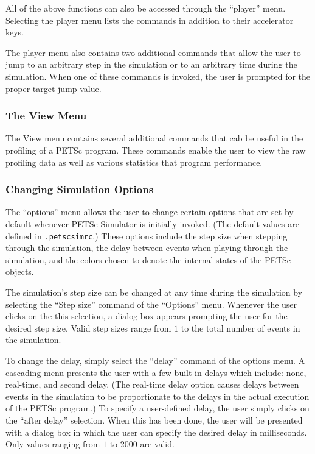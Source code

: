 All of the above functions can also be accessed through the ``player''
menu.  Selecting the player menu lists the commands in addition to
their accelerator keys.

The player menu also contains two additional commands that allow the
user to jump to an arbitrary step in the simulation or to an arbitrary
time during the simulation.  When one of these commands is invoked,
the user is prompted for the proper target jump value.

\subsubsection{The View Menu}

The View menu contains several additional commands that cab be useful
in the profiling of a PETSc program.  These commands enable the user
to view the raw profiling data as well as various statistics that
program performance.

\subsubsection{Changing Simulation Options}

The ``options'' menu allows the user to change certain options that
are set by default whenever PETSc Simulator is initially invoked.
(The default values are defined in {\tt .petscsimrc}.) These options
include the step size when stepping through the simulation, the delay
between events when playing through the simulation, and the colors
chosen to denote the internal states of the PETSc objects.

The simulation's step size can be changed at any time during the
simulation by selecting the ``Step size'' command of the ``Options''
menu.  Whenever the user clicks on the this selection, a dialog box
appears prompting the user for the desired step size.  Valid step
sizes range from $1$ to the total number of events in the simulation.

To change the delay, simply select the ``delay'' command of the options
menu.  A cascading menu presents the user with a few built-in delays
which include: none, real-time, and second delay.  (The real-time
delay option causes delays between events in the simulation to be
proportionate to the delays in the actual execution of the PETSc
program.)  To specify a user-defined delay, the user simply clicks on
the ``after delay'' selection.  When this has been done, the user will be
presented with a dialog box in which the user can specify the desired
delay in milliseconds.  Only values ranging from $1$ to $2000$ are
valid.


